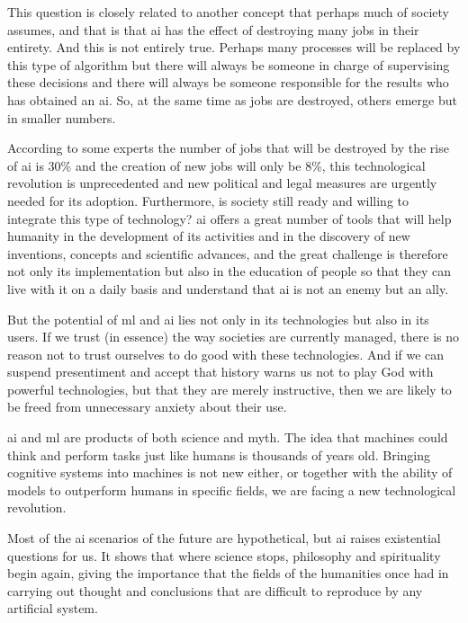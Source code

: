 This question is closely related to another concept that perhaps much of society assumes, and that is that \acrshort{ai} has the effect of destroying many jobs in their entirety. And this is not entirely true. Perhaps many processes will be replaced by this type of algorithm but there will always be someone in charge of supervising these decisions and there will always be someone responsible for the results who has obtained an \acrshort{ai}. So, at the same time as jobs are destroyed, others emerge but in smaller numbers.
\newline

According to some experts the number of jobs that will be destroyed by the rise of \acrlong{ai} is 30\% \cite{aijobs} and the creation of new jobs will only be 8\%, this technological revolution is unprecedented and new political and legal measures are urgently needed for its adoption. Furthermore, is society still ready and willing to integrate this type of technology? \acrshort{ai} offers a great number of tools that will help humanity in the development of its activities and in the discovery of new inventions, concepts and scientific advances, and the great challenge is therefore not only its implementation but also in the education of people so that they can live with it on a daily basis and understand that \acrshort{ai} is not an enemy but an ally.
\newline

But the potential of \acrlong{ml} and \acrlong{ai} lies not only in its technologies but also in its users. If we trust (in essence) the way societies are currently managed, there is no reason not to trust ourselves to do good with these technologies. And if we can suspend presentiment and accept that history warns us not to play God with powerful technologies, but that they are merely instructive, then we are likely to be freed from unnecessary anxiety about their use.
\newline

\acrlong{ai} and \acrlong{ml} are products of both science and myth. The idea that machines could think and perform tasks just like humans is thousands of years old. Bringing cognitive systems into machines is not new either, or together with the ability of models to outperform humans in specific fields, we are facing a new technological revolution.
\newline

Most of the \acrshort{ai} scenarios of the future are hypothetical, but \acrshort{ai} raises existential questions for us. It shows that where science stops, philosophy and spirituality begin again, giving the importance that the fields of the humanities once had in carrying out thought and conclusions that are difficult to reproduce by any artificial system.




